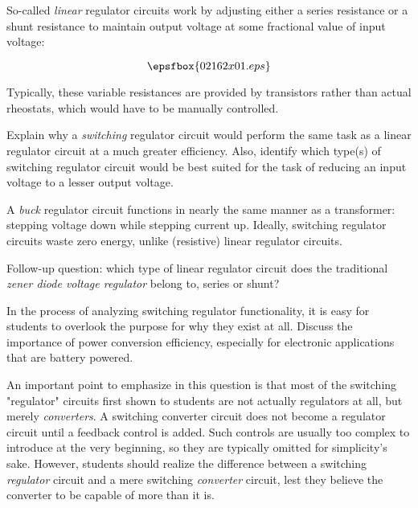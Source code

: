 

So-called {\it linear} regulator circuits work by adjusting either a series resistance or a shunt resistance to maintain output voltage at some fractional value of input voltage:

$$\epsfbox{02162x01.eps}$$

Typically, these variable resistances are provided by transistors rather than actual rheostats, which would have to be manually controlled.

Explain why a {\it switching} regulator circuit would perform the same task as a linear regulator circuit at a much greater efficiency.  Also, identify which type(s) of switching regulator circuit would be best suited for the task of reducing an input voltage to a lesser output voltage.







A {\it buck} regulator circuit functions in nearly the same manner as a transformer: stepping voltage down while stepping current up.  Ideally, switching regulator circuits waste zero energy, unlike (resistive) linear regulator circuits.

\vskip 10pt

Follow-up question: which type of linear regulator circuit does the traditional {\it zener diode voltage regulator} belong to, series or shunt?







In the process of analyzing switching regulator functionality, it is easy for students to overlook the purpose for why they exist at all.  Discuss the importance of power conversion efficiency, especially for electronic applications that are battery powered.

An important point to emphasize in this question is that most of the switching "regulator" circuits first shown to students are not actually regulators at all, but merely {\it converters}.  A switching converter circuit does not become a regulator circuit until a feedback control is added.  Such controls are usually too complex to introduce at the very beginning, so they are typically omitted for simplicity's sake.  However, students should realize the difference between a switching {\it regulator} circuit and a mere switching {\it converter} circuit, lest they believe the converter to be capable of more than it is.




